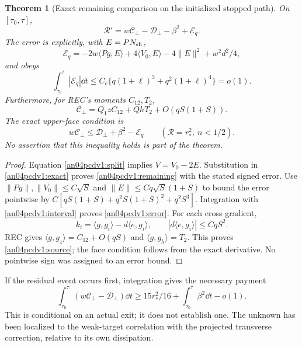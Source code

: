 \documentclass[11pt]{article}
\newtheorem{theorem}{Theorem}
\begin{document}
\begin{theorem}[Exact remaining comparison on the initialized stopped path]
\label{an04pcdv1:main}
On $[\tau_0,\tau]$,
\begin{equation}\label{an04pcdv1:remaining}
 \boxed{\quad\mathcal R'=w\mathcal C_\perp
                 -\mathcal D_\perp-\beta^2+\mathcal E_q.\quad}
\end{equation}
The error is explicitly, with $E=PN_{\rm sh}$,
\[
 \mathcal E_q=-2w\langle Pg,E\rangle+4\langle V_0,E\rangle
                  -4\|E\|^2+w^2d^2/4,
\]
and obeys
\begin{equation}\label{an04pcdv1:error}
 \int_{\tau_0}^{\tau}|\mathcal E_q|\dd t
 \le C_c\{q(1+\ell)^3+q^2(1+\ell)^4\}=o(1).
\end{equation}
Furthermore, for REC's moments $C_{12},T_2$,
\begin{equation}\label{an04pcdv1:source}
 \mathcal C_\perp=Q_1zC_{12}+QhT_2+O(qS(1+S)).
\end{equation}
The exact upper-face condition is
\begin{equation}\label{an04pcdv1:face}
 w\mathcal C_\perp\le\mathcal D_\perp+\beta^2-\mathcal E_q
       \qquad(\mathcal R=r_*^2,\ n<1/2).
\end{equation}
No assertion that this inequality holds is part of the theorem.
\end{theorem}
\begin{proof}
Equation \eqref{an04pcdv1:split} implies $V=V_0-2E$.
Substitution in \eqref{an04pcdv1:exact} proves
\eqref{an04pcdv1:remaining} with the stated signed error.
Use $\|Pg\|,\|V_0\|\le C\sqrt S$ and
$\|E\|\le Cq\sqrt S(1+S)$ to bound the error pointwise by
$C[qS(1+S)+q^2S(1+S)^2+q^2S^3]$.
Integration with \eqref{an04pcdv1:interval} proves
\eqref{an04pcdv1:error}.
For each cross gradient,
\[
 k_i=\langle g,g_i\rangle-d\langle e,g_i\rangle,
 \qquad |d\langle e,g_i\rangle|\le CqS^2.
\]
REC gives $\langle g,g_z\rangle=C_{12}+O(qS)$ and
$\langle g,g_h\rangle=T_2$. This proves
\eqref{an04pcdv1:source}; the face condition follows from the exact
derivative. No pointwise sign was assigned to an error bound.
\end{proof}

If the residual event occurs first, integration gives the necessary
payment
\begin{equation}\label{an04pcdv1:exit}
 \int_{\tau_0}^{\tau}(w\mathcal C_\perp-\mathcal D_\perp)\dd t
 \ge15r_*^2/16+\int_{\tau_0}^{\tau}\beta^2\dd t-o(1).
\end{equation}
This is conditional on an actual exit; it does not establish one.
The unknown has been localized to the weak-target correlation with
the projected transverse correction, relative to its own dissipation.
\end{document}

